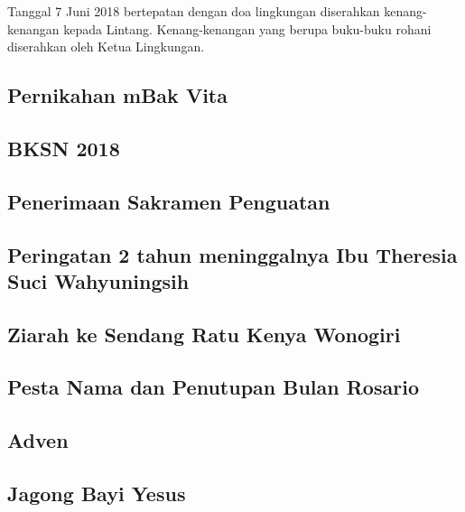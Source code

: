 Tanggal 7 Juni 2018 bertepatan dengan doa lingkungan diserahkan kenang-kenangan kepada Lintang. Kenang-kenangan yang berupa buku-buku rohani diserahkan oleh Ketua Lingkungan.

\subsection*{Pernikahan mBak Vita}

\subsection*{BKSN 2018}

\subsection*{Penerimaan Sakramen Penguatan}

\subsection*{Peringatan 2 tahun meninggalnya Ibu Theresia Suci Wahyuningsih}


\subsection*{Ziarah ke Sendang Ratu Kenya Wonogiri}

\subsection*{Pesta Nama dan Penutupan Bulan  Rosario}

\subsection*{Adven}
	
\subsection*{Jagong Bayi Yesus}

